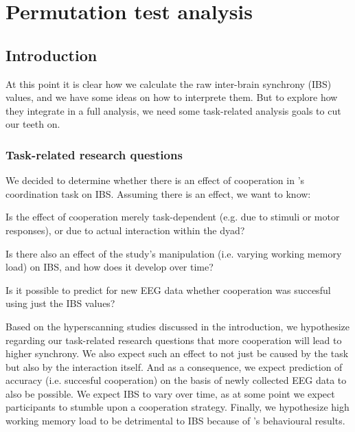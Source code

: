 
\section{Permutation test analysis}
\label{sec:permutationtest}

\subsection{Introduction}

At this point it is clear how we calculate the raw inter-brain synchrony (IBS)
values, and we have some ideas on how to interprete them. But to
explore how they integrate in a full analysis, we need some task-related
analysis goals to cut our teeth on.

\subsubsection{Task-related research questions}
We decided to determine whether there is an effect of cooperation in
\textcite{newman_effects_2021}'s coordination task on IBS. Assuming there is an
effect, we want to know:

\begin{APAenumerate}
  \item Is the effect of cooperation merely task-dependent (e.g. due to stimuli
  or motor responses), or due to actual interaction within the dyad?
  \item Is there also an effect of the study's manipulation (i.e. varying
  working memory load) on IBS, and how does it develop over time?
  \item Is it possible to predict for new EEG data whether cooperation was
  succesful using just the IBS values?
\end{APAenumerate}

Based on the hyperscanning studies discussed in the introduction, we hypothesize
regarding our task-related research questions that more cooperation will lead to
higher synchrony. We also expect such an effect to not just be caused by the
task but also by the interaction itself. And as a consequence, we expect
prediction of accuracy (i.e. succesful cooperation) on the basis of newly
collected EEG data to also be possible. We expect IBS to vary over time, as at
some point we expect participants to stumble upon a cooperation strategy.
Finally, we hypothesize high working memory load to be detrimental to IBS
because of \textcite{maehara_i_2011,newman_effects_2021}'s behavioural results.


